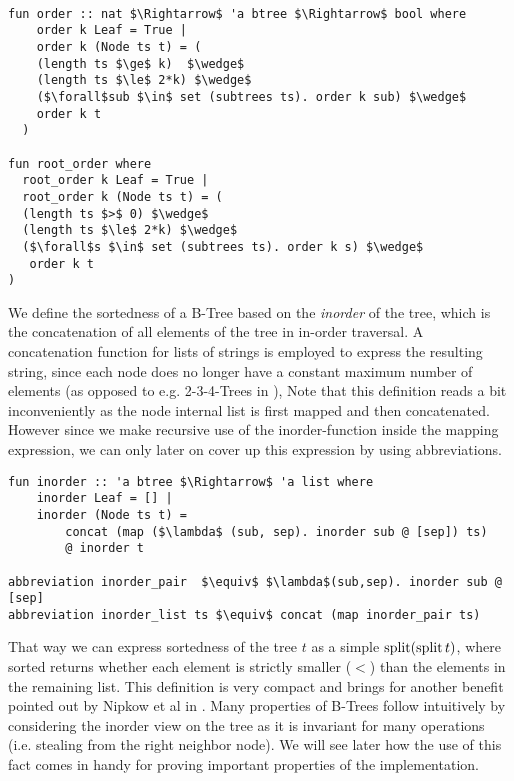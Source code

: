 \begin{lstlisting}[mathescape=true, language=Isabelle]

fun order :: nat $\Rightarrow$ 'a btree $\Rightarrow$ bool where
    order k Leaf = True |
    order k (Node ts t) = (
    (length ts $\ge$ k)  $\wedge$
    (length ts $\le$ 2*k) $\wedge$
    ($\forall$sub $\in$ set (subtrees ts). order k sub) $\wedge$
    order k t
  )

fun root_order where
  root_order k Leaf = True |
  root_order k (Node ts t) = (
  (length ts $>$ 0) $\wedge$
  (length ts $\le$ 2*k) $\wedge$
  ($\forall$s $\in$ set (subtrees ts). order k s) $\wedge$
   order k t
)

\end{lstlisting}

We define the sortedness of a B-Tree based on the \textit{inorder} of the tree,
which is the concatenation of all elements of the tree in in-order traversal.
A concatenation function for lists of strings
is employed to express the resulting string,
since each node does no longer have a constant maximum number of elements (as opposed to
e.g. 2-3-4-Trees in \parencite{DBLP:conf/itp/Nipkow16}),
Note that this definition reads a bit inconveniently
as the node internal list is first mapped and then concatenated.
However since we make recursive use of the inorder-function
inside the mapping expression, we can only later on cover up this expression
by using abbreviations.

\begin{lstlisting}[mathescape=true, language=Isabelle]
fun inorder :: 'a btree $\Rightarrow$ 'a list where
    inorder Leaf = [] |
    inorder (Node ts t) = 
        concat (map ($\lambda$ (sub, sep). inorder sub @ [sep]) ts)
        @ inorder t

abbreviation inorder_pair  $\equiv$ $\lambda$(sub,sep). inorder sub @ [sep]
abbreviation inorder_list ts $\equiv$ concat (map inorder_pair ts)
\end{lstlisting}

That way we can express sortedness of the tree $t$ as a simple $\operatorname{split} (\operatorname{split} t)$,
where sorted returns whether each element is strictly smaller ($<$) than the elements in the remaining list.
This definition is very compact and brings for another benefit pointed out by Nipkow et al in \parencite{DBLP:conf/itp/Nipkow16}.
Many properties of B-Trees follow intuitively by considering
the inorder view on the tree as it is invariant for many operations (i.e. stealing from the right neighbor node).
We will see later how the use of this fact comes in handy for proving
important properties of the implementation.

